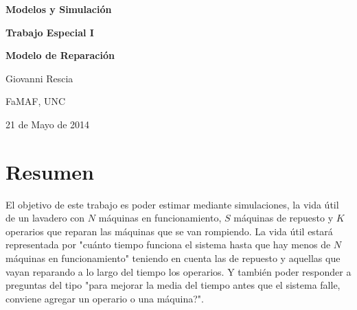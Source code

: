 \documentclass[12pt]{article}
\begin{document}
\begin{titlepage}
\begin{center}
\vspace*{1.5in}
\begin{Large}
\textbf{Modelos y Simulación}
\vspace{0.5in}

\textbf{Trabajo Especial I}

\vspace{0.3in}
\textbf{Modelo de Reparación}

\vspace{1.5in}
Giovanni Rescia

\vspace*{0.4in}

FaMAF, UNC
\vspace*{.13in}

21 de Mayo de 2014
\end{Large}
\end{center}
\end{titlepage}

\author{Giovanni Rescia \\ \\ \large FaMAF}
\date{21 de Mayo de 2014}



\pagebreak
\section{Resumen}
\vspace{0.4in}
El objetivo de este trabajo es poder estimar mediante simulaciones,
la vida \'util de un lavadero con $N$ máquinas en funcionamiento,
$S$ máquinas de repuesto y $K$ operarios que reparan las máquinas
que se van rompiendo. La vida \'util estará representada por
"cuánto tiempo funciona el sistema hasta que hay menos de $N$
máquinas en funcionamiento" teniendo en cuenta las de repuesto
y aquellas que vayan reparando a lo largo del tiempo los operarios.
Y también poder responder a preguntas del tipo "para mejorar la media
del tiempo antes que el sistema falle, conviene agregar un operario
o una máquina?".
\end{document}
